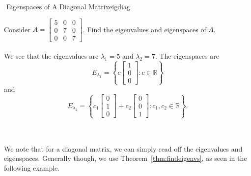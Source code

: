         \begin{example}{\Difficulty\,\,Eigenspaces of A Diagonal Matrix}{eigdiag}

            Consider \(A=\begin{bmatrix} 5 & 0 & 0 \\ 0 & 7 & 0 \\ 0 & 0 & 7 \end{bmatrix}\). Find the eigenvalues and eigenspaces of \(A\).
            \\
            \\
            We see that the eigenvalues are \(\lambda_1=5\) and \(\lambda_2=7\). The eigenspaces are
            \begin{equation*}
                E_{\lambda_1}=\left\{c\begin{bmatrix} 1 \\ 0 \\ 0 \end{bmatrix}:c\in\mathbb{R}\right\}
            \end{equation*}
            and
            \begin{equation*}
                E_{\lambda_2}=\left\{c_1\begin{bmatrix} 0 \\ 1 \\ 0 \end{bmatrix}+c_2\begin{bmatrix} 0 \\ 0 \\ 1 \end{bmatrix}:c_1,c_2\in\mathbb{R}\right\}.
            \end{equation*}

        \end{example}
        \pagebreak
        \vphantom
        \\
        \\
        We note that for a diagonal matrix, we can simply read off the eigenvalues and eigenspaces. Generally though, we use Theorem~\ref{thm:findeigenvs}, as seen in the following example.
